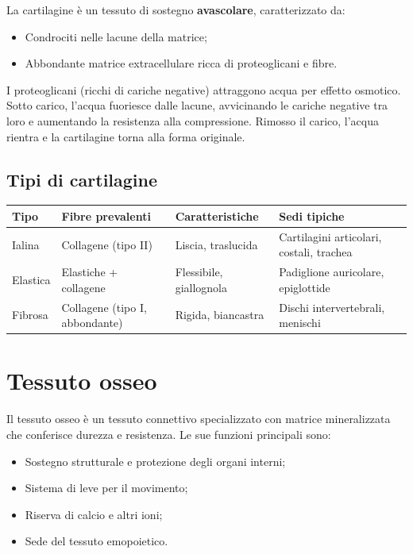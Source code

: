 \documentclass[11pt,a4paper,openright,twoside]{book}
\theoremstyle{definition}
\theoremstyle{plain}
\theoremstyle{remark}
\begin{document}
La cartilagine è un tessuto di sostegno \textbf{avascolare}, caratterizzato da:
\begin{itemize}
  \item Condrociti nelle lacune della matrice;
  \item Abbondante matrice extracellulare ricca di proteoglicani e fibre.
\end{itemize}

\begin{tcolorbox}[notebox, title={Meccanismo di resistenza alla compressione}]
  I proteoglicani (ricchi di cariche negative) attraggono acqua per effetto osmotico. Sotto carico, l'acqua fuoriesce dalle lacune, avvicinando le cariche negative tra loro e aumentando la resistenza alla compressione. Rimosso il carico, l'acqua rientra e la cartilagine torna alla forma originale.
\end{tcolorbox}

\subsection{Tipi di cartilagine}

\begin{center}
\begin{tabular}{llll}
\toprule
\textbf{Tipo} & \textbf{Fibre prevalenti} & \textbf{Caratteristiche} & \textbf{Sedi tipiche} \\
\midrule
Ialina & Collagene (tipo II) & Liscia, traslucida & Cartilagini articolari, costali, trachea \\
Elastica & Elastiche + collagene & Flessibile, giallognola & Padiglione auricolare, epiglottide \\
Fibrosa & Collagene (tipo I, abbondante) & Rigida, biancastra & Dischi intervertebrali, menischi \\
\bottomrule
\end{tabular}
\end{center}

\section{Tessuto osseo}

Il tessuto osseo è un tessuto connettivo specializzato con matrice mineralizzata che conferisce durezza e resistenza. Le sue funzioni principali sono:
\begin{itemize}
  \item Sostegno strutturale e protezione degli organi interni;
  \item Sistema di leve per il movimento;
  \item Riserva di calcio e altri ioni;
  \item Sede del tessuto emopoietico.
\end{itemize}
\end{document}
